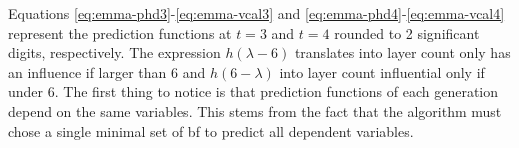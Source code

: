 Equations \ref{eq:emma-phd3}-\ref{eq:emma-vcal3} and \ref{eq:emma-phd4}-\ref{eq:emma-vcal4} represent the prediction functions at $t=3$ and $t=4$ rounded to 2 significant digits, respectively.
The expression $h(\lambda-6)$ translates into layer count only has an influence if larger than 6 
and $h(6-\lambda)$ into layer count influential only if under 6.
%
The first thing to notice is that prediction functions of each generation depend on the same variables. 
This stems from the fact that the algorithm must chose a single minimal set of \gls{bf} to predict all dependent variables. 
%


